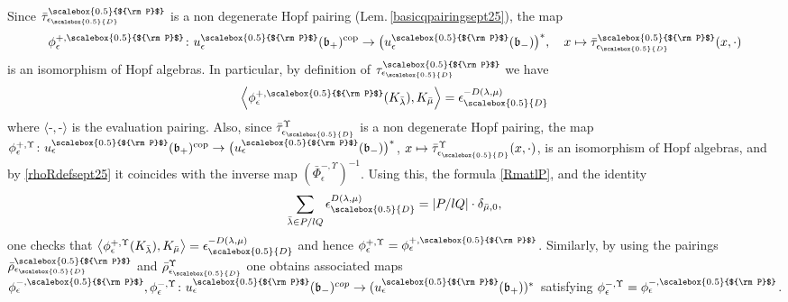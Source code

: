 \documentclass[11pt]{amsart}
\newcommand{\e}{\epsilon}
\newcommand{\eD}{\epsilon_{\scalebox{0.5}{D}}}
\newcommand{\Pup}{{\scalebox{0.5}{${\rm P}$}}}
\begin{document}
Since $\bar{\tau}_{\eD}^\Pup$ is a non degenerate Hopf pairing (Lem.\,\ref{basicqpairingsept25}), the map
\[ \phi_\e^{+,\Pup}\colon u_\e^\Pup(\mathfrak{b}_+)^{\mathrm{cop}} \to \bigl(u_\e^\Pup(\mathfrak{b}_-)\bigr)^*, \quad x\mapsto \bar{\tau}_{\eD}^\Pup(x,\cdot) \]
is an isomorphism of Hopf algebras. In particular, by definition of $\tau_{\eD}^\Pup$ we have
$$\left\langle \phi_\e^{+,\Pup}(K_{\bar{\lambda}}),K_{\bar{\mu}} \right\rangle = \eD^{-D(\lambda,\mu)}$$
where $\langle \text{-}, \text{-} \rangle$ is the evaluation pairing. Also, since $\bar{\tau}_{\eD}^\Upsilon$ is a non degenerate Hopf pairing, the map $\phi_\e^{+, \Upsilon}\colon u_\e^\Pup(\mathfrak{b}_+)^{\mathrm{cop}} \to \bigl(u_\e^\Pup(\mathfrak{b}_-)\bigr)^*$, $x\mapsto \bar{\tau}_{\eD}^\Upsilon(x,\cdot)$, is an isomorphism of Hopf algebras, and by \eqref{rhoRdefsept25} it coincides with the inverse map $(\bar\Phi_\e^{-,\Upsilon})^{-1}$. Using this, the formula \eqref{RmatlP}, and the identity 
$$\sum_{\bar{\lambda}\in P/lQ} \eD^{D(\lambda,\mu)} = \vert P/lQ\vert\cdot \delta_{\bar{\mu},0},$$
one checks that $\left\langle \phi_\e^{+, \Upsilon}(K_{\bar{\lambda}}), K_{\bar{\mu}} \right\rangle = \eD^{-D(\lambda,\mu)}$ and hence $\phi_\e^{+, \Upsilon} = \phi_\e^{+,\Pup}$. Similarly, by using the pairings $\bar{\rho}_{\eD}^\Pup$ and $\bar{\rho}_{\eD}^\Upsilon$ one obtains associated maps $\phi_\e^{-, \Pup}, \phi_\e^{-, \Upsilon} \colon u_\e^\Pup(\mathfrak{b}_-)^{cop} \to (u_\e^\Pup(\mathfrak{b}_+))^*$ satisfying $\phi_\e^{-, \Upsilon} = \phi_\e^{-,\Pup}$. 
\end{document}
